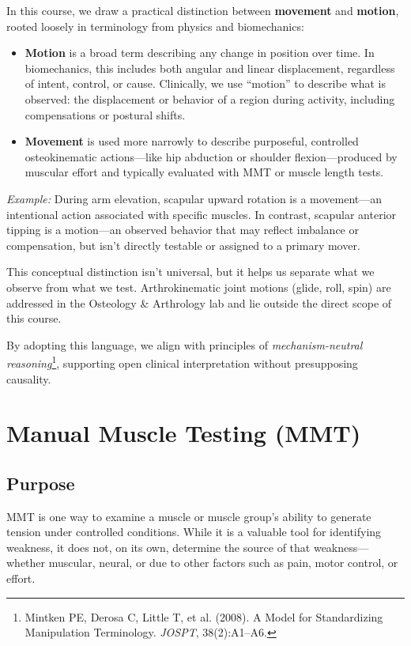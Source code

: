 \begin{tcolorbox}[colback=gray!5, colframe=black, title=Clarifying Movement \& Motion in This Course]

In this course, we draw a practical distinction between \textbf{movement} and \textbf{motion}, rooted loosely in terminology from physics and biomechanics:

\begin{itemize}
  \item \textbf{Motion} is a broad term describing any change in position over time. In biomechanics, this includes both angular and linear displacement, regardless of intent, control, or cause. Clinically, we use “motion” to describe what is observed: the displacement or behavior of a region during activity, including compensations or postural shifts.

  \item \textbf{Movement} is used more narrowly to describe purposeful, controlled osteokinematic actions—like hip abduction or shoulder flexion—produced by muscular effort and typically evaluated with MMT or muscle length tests.
\end{itemize}

\textit{Example:} During arm elevation, scapular upward rotation is a movement—an intentional action associated with specific muscles. In contrast, scapular anterior tipping is a motion—an observed behavior that may reflect imbalance or compensation, but isn’t directly testable or assigned to a primary mover.

This conceptual distinction isn’t universal, but it helps us separate what we observe from what we test. Arthrokinematic joint motions (glide, roll, spin) are addressed in the Osteology \& Arthrology lab and lie outside the direct scope of this course.

By adopting this language, we align with principles of \textit{mechanism-neutral reasoning}\footnote{Mintken PE, Derosa C, Little T, et al. (2008). A Model for Standardizing Manipulation Terminology. \textit{JOSPT}, 38(2):A1–A6.}, supporting open clinical interpretation without presupposing causality.

\end{tcolorbox}

\section*{Manual Muscle Testing (MMT)}

\subsection*{Purpose}
MMT is one way to examine a muscle or muscle group’s ability to generate tension under controlled conditions. While it is a valuable tool for identifying weakness, it does not, on its own, determine the source of that weakness—whether muscular, neural, or due to other factors such as pain, motor control, or effort.

